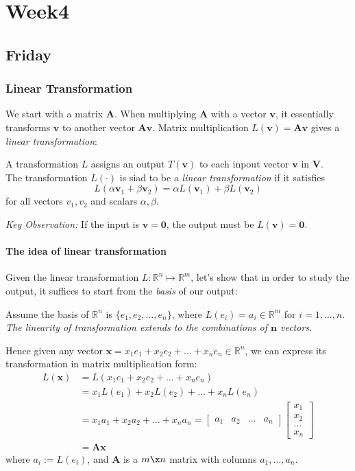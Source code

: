 
\chapter{Week4}

\section{Friday}
\subsection{Linear Transformation}
We start with a matrix $\bm A$. When multiplying $\bm A$ with a vector $\bm v$, it essentially transforms $\bm v$ to another vector $\bm{Av}$. Matrix multiplication $L(\bm v) = \bm{Av}$ gives a \emph{linear transformation}:
\begin{definition}
A transformation $L$ assigns an output $T(\bm v)$ to each inpout vector $\bm v$ in $\bm V$.\\
The transformation $L(\cdot)$ is siad to be a \emph{linear transformation} if it satisfies
\[
L(\alpha \bm v_1 + \beta \bm v_2)=\alpha L(\bm v_1)+\beta L(\bm v_2)
\]
for all vectors $v_1,v_2$ and scalars $\alpha,\beta$.
\end{definition}
\emph{Key Observation:} If the input is $\bm v = \bm 0$, the output must be $L(\bm v) = \bm 0$.
\subsubsection{The idea of linear transformation}
Given the linear transformation $L: \mathbb{R}^{n}\mapsto\mathbb{R}^{m}$, let's show that in order to study the output, it suffices to start from the \emph{basis} of our output: 

Assume the basis of $\mathbb{R}^{n}$ is $\{e_1,e_2,\dots,e_n\}$, where $L(e_i)=a_i\in\mathbb{R}^{m}$ for $i=1,\dots,n$. \emph{The linearity of transformation extends to the combinations of $\bm n$ vectors.}

Hence given any vector $\bm x=x_1e_1+x_2e_2+\dots+x_ne_n\in\mathbb{R}^{n}$, we can express its transformation in matrix multiplication form:
\[
\begin{aligned}
L(\bm x) &= L(x_1e_1+x_2e_2+\dots+x_ne_n)\\
			 &= x_1L(e_1)+x_2L(e_2)+\dots+x_nL(e_n)\\
			 &= x_1a_1+x_2a_2+\dots+x_na_n=\begin{bmatrix}
a_1&a_2&\dots&a_n
\end{bmatrix}\begin{bmatrix}
x_1\\x_2\\\dots\\x_n
\end{bmatrix}\\
			 &= \bm{Ax}
\end{aligned}
\]
where $a_i:=L(e_i)$, and $\bm A$ is a $m\x n$ matrix with columns $a_1,\dots,a_n$.

